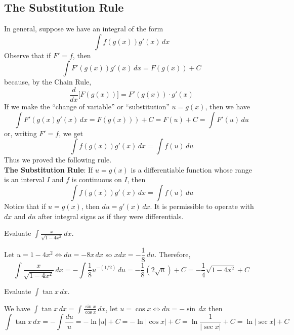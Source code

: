 \subsection{The Substitution Rule}
In general, suppose we have an integral of the form
\[\int f(g(x))g'(x)\,dx\]
Observe that if \(F'=f\), then
\[\int F'(g(x))g'(x)\,dx=F(g(x))+C\]
because, by the Chain Rule,
\[\frac{d}{dx}\big[F(g(x))\big]=F'(g(x))\cdot g'(x)\]
If we make the ``change of variable'' or ``substitution'' \(u=g(x)\), then we
have
\[\int F'(g(x)g'(x)\,dx=F(g(x)))+C=F(u)+C=\int F'(u)\,du\]
or, writing \(F'=f\), we get
\[\int f(g(x))g'(x)\,dx=\int f(u)\,du\]
Thus we proved the following rule. \\
\textbf{The Substitution Rule}: If \(u=g(x)\) is a differentiable function
whose range is an interval \(I\) and \(f\) is continuous on \(I\), then
\[\int f(g(x))g'(x)\,dx=\int f(u)\,du\]
Notice that if \(u=g(x)\), then \(du=g'(x)\,dx\).
It is permissible to operate with \(dx\) and \(du\) after integral signs as if
they were differentials.

\begin{problem}
    Evaluate \(\displaystyle{\int\frac{x}{\sqrt{1-4x^2}}\,dx}\).
\end{problem}
\begin{solution}
    Let \(u=1-4x^2\iff du=-8x\,dx\) so \(xdx=-\dfrac{1}{8}\,du\).
    Therefore,
    \[\int\frac{x}{\sqrt{1-4x^2}}\,dx=-\int\frac{1}{8}u^{-(1/2)}\,du
    =-\frac{1}{8}(2\sqrt{u})+C=-\frac{1}{4}\sqrt{1-4x^2}+C\]
\end{solution}
\begin{problem}
    Evaluate \(\displaystyle{\int\tan x\,dx}\).
\end{problem}
\begin{solution}
    We have \(\displaystyle{\int\tan x\,dx=\int\frac{\sin x}{\cos x}}\,dx\),
    let \(u=\cos x \iff du=-\sin\,dx\) then
    \[\int\tan x\,dx=-\int\frac{du}{u}=-\ln|u|+C=-\ln|\cos x|+C
    =\ln\frac{1}{|\sec x|}+C=\ln|\sec x|+C\]
\end{solution}

